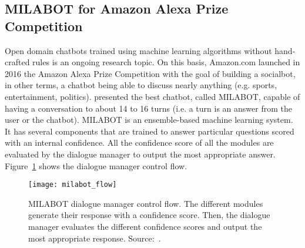 \subsection{MILABOT for Amazon Alexa Prize Competition}
Open domain chatbots trained using machine learning algorithms without hand-crafted rules is an ongoing research topic. On this basis, Amazon.com launched in 2016 the Amazon Alexa Prize Competition with the goal of building a socialbot, in other terms, a chatbot being able to discuss nearly anything (e.g. sports, entertainment, politics). \citet{alexa-1709.02349} presented the best chatbot, called MILABOT, capable of having a conversation to about 14 to 16 turns (i.e. a turn is an answer from the user or the chatbot).
MILABOT is an ensemble-based machine learning system. It has several components that are trained to answer particular questions scored with an internal confidence. All the confidence score of all the modules are evaluated by the dialogue manager to output the most appropriate answer. Figure~\ref{fig:milabot-flow} shows the dialogue manager control flow.

\begin{figure}
    \centering
    \texttt{[image: milabot\_flow]}
    \decoRule
    \caption[MILABOT dialogue manager control flow]{MILABOT dialogue manager control flow. The different modules generate their response with a confidence score. Then, the dialogue manager evaluates the different confidence scores and output the most appropriate response. Source:~\citet{alexa-1709.02349}.}
    \label{fig:milabot-flow}
\end{figure}

